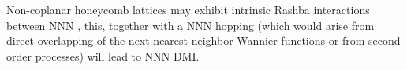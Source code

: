 Non-coplanar honeycomb lattices may exhibit intrinsic Rashba interactions between NNN \cite{Liu2011}, this, together with a NNN hopping (which would arise from direct overlapping of the next nearest neighbor Wannier functions or from second order processes) will lead to NNN DMI.











